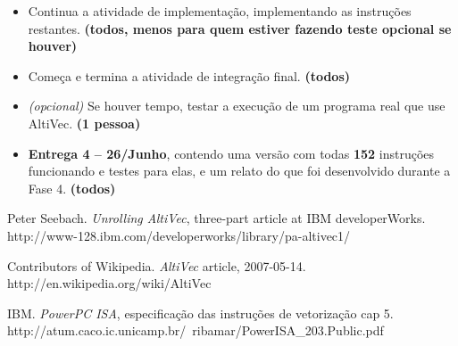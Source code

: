 \documentclass[twocolumn]{article}
\newcommand{\who}[1]{\textbf{ (#1)}}
\begin{document}
\begin{itemize}

\item Continua a atividade de implementação, implementando as instruções
restantes. \who{todos, menos para quem estiver fazendo teste opcional se
houver}

\item Começa e termina a atividade de integração final. \who{todos}

\item \emph{(opcional)} Se houver tempo, testar a execução de um programa real
que use AltiVec. \who{1 pessoa}

\item \textbf{Entrega 4 -- 26/Junho}, contendo uma versão com todas
\textbf{152} instruções funcionando e testes para elas, e um relato do que foi
desenvolvido durante a Fase 4. \who{todos}

\end{itemize}


\begin{thebibliography}{10}


 Peter Seebach. {\em Unrolling AltiVec}, three-part article at
IBM developerWorks.  http://www-128.ibm.com/developerworks/library/pa-altivec1/

 Contributors of Wikipedia. {\em AltiVec} article,
2007-05-14. http://en.wikipedia.org/wiki/AltiVec

 IBM. {\em PowerPC ISA}, especificação das instruções de
vetorização cap 5.
http://atum.caco.ic.unicamp.br/~ribamar/PowerISA\_203.Public.pdf



\end{thebibliography}
\end{document}
